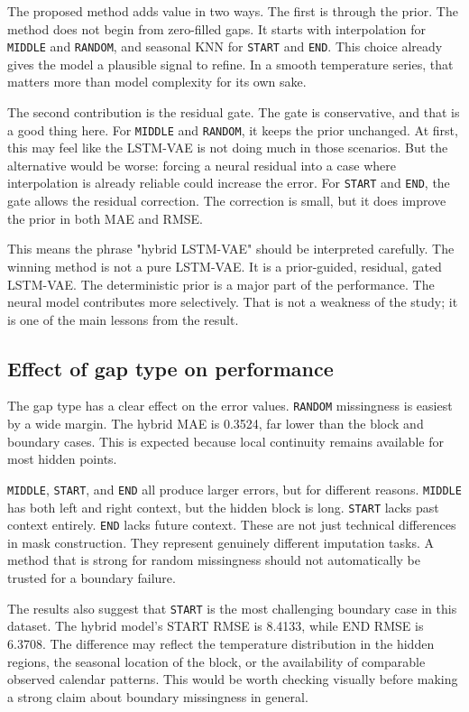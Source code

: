 The proposed method adds value in two ways. The first is through the prior. The method does not begin from zero-filled gaps. It starts with interpolation for \texttt{MIDDLE} and \texttt{RANDOM}, and seasonal KNN for \texttt{START} and \texttt{END}. This choice already gives the model a plausible signal to refine. In a smooth temperature series, that matters more than model complexity for its own sake.

The second contribution is the residual gate. The gate is conservative, and that is a good thing here. For \texttt{MIDDLE} and \texttt{RANDOM}, it keeps the prior unchanged. At first, this may feel like the LSTM-VAE is not doing much in those scenarios. But the alternative would be worse: forcing a neural residual into a case where interpolation is already reliable could increase the error. For \texttt{START} and \texttt{END}, the gate allows the residual correction. The correction is small, but it does improve the prior in both MAE and RMSE.

This means the phrase "hybrid LSTM-VAE" should be interpreted carefully. The winning method is not a pure LSTM-VAE. It is a prior-guided, residual, gated LSTM-VAE. The deterministic prior is a major part of the performance. The neural model contributes more selectively. That is not a weakness of the study; it is one of the main lessons from the result.

\subsection{Effect of gap type on performance}

The gap type has a clear effect on the error values. \texttt{RANDOM} missingness is easiest by a wide margin. The hybrid MAE is 0.3524, far lower than the block and boundary cases. This is expected because local continuity remains available for most hidden points.

\texttt{MIDDLE}, \texttt{START}, and \texttt{END} all produce larger errors, but for different reasons. \texttt{MIDDLE} has both left and right context, but the hidden block is long. \texttt{START} lacks past context entirely. \texttt{END} lacks future context. These are not just technical differences in mask construction. They represent genuinely different imputation tasks. A method that is strong for random missingness should not automatically be trusted for a boundary failure.

The results also suggest that \texttt{START} is the most challenging boundary case in this dataset. The hybrid model's START RMSE is 8.4133, while END RMSE is 6.3708. The difference may reflect the temperature distribution in the hidden regions, the seasonal location of the block, or the availability of comparable observed calendar patterns. This would be worth checking visually before making a strong claim about boundary missingness in general.

